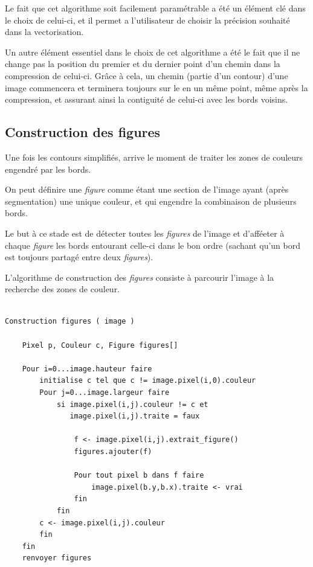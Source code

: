 \documentclass[twoside,openright,a4paper,11pt,french]{article}
\begin{document}
Le fait que cet algorithme soit facilement paramétrable a été un élément clé
dans le choix de celui-ci, et il permet a l'utilisateur de choisir la précision
souhaité dans la vectorisation.

Un autre élément essentiel dans le choix de cet algorithme a été le
fait que il ne change pas la position du premier et du dernier point
d'un chemin dans la compression de celui-ci. Grâce à cela, un chemin
(partie d'un contour) d'une image commencera et terminera toujours sur
le en un même point, même après la compression, et assurant ainsi la
contiguité de celui-ci avec les bords voisins.



\subsection{Construction des figures}
Une fois les contours simplifiés, arrive le moment de traiter
les zones de couleurs engendré par les bords.

On peut définire une {\it figure} comme étant une section de l'image ayant
(après segmentation) une unique couleur, et qui engendre la combinaison de
plusieurs bords.

Le but à ce stade est de détecter toutes les {\it figures} de l'image et
d'afféeter à chaque {\it figure} les bords entourant celle-ci dans le
bon ordre (sachant qu'un bord est toujours partagé entre deux
{\it figures}).

L'algorithme de construction des {\it figures} consiste à parcourir
l'image à la recherche des zones de couleur.

\begin{lstlisting}[frame=single]  % Start your code-block

Construction figures ( image )

    Pixel p, Couleur c, Figure figures[]

    Pour i=0...image.hauteur faire
        initialise c tel que c != image.pixel(i,0).couleur 
        Pour j=0...image.largeur faire
            si image.pixel(i,j).couleur != c et 
               image.pixel(i,j).traite = faux

                f <- image.pixel(i,j).extrait_figure()
                figures.ajouter(f)

                Pour tout pixel b dans f faire
                    image.pixel(b.y,b.x).traite <- vrai
                fin 
            fin 
        c <- image.pixel(i,j).couleur
        fin
    fin
    renvoyer figures
\end{lstlisting}
\end{document}
